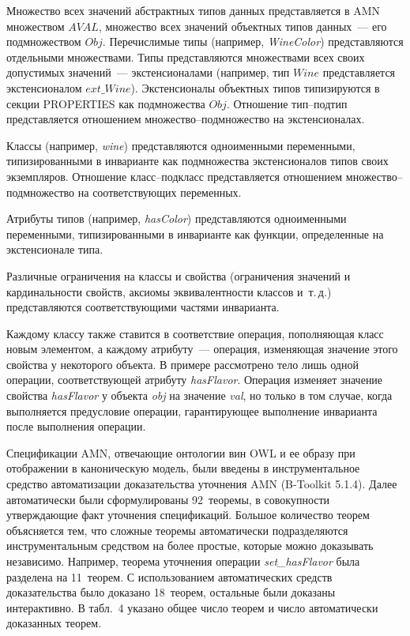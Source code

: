 \begin{multicols}{2}
Множество всех значений абстрактных типов данных представляется в AMN
 множеством $AV\!AL$,
множество всех значений объектных типов данных~--- его подмножеством $Obj$.
Перечислимые %
\mbox{типы} (например, {\it WineColor}) представляются
отдельными множествами.
Типы представляются множествами всех своих допустимых значений~--- %
экстенсионалами
(например, тип $Wine$ пред\-став\-ля\-ет\-ся экстенсионалом $ext\_Wine$).
Экстенсионалы объектных типов типизируются в секции \mbox{PROPERTIES}
как подмножества $Obj$.
Отношение тип--под\-тип представляется отношением мно\-же\-ст\-во--под\-мно\-же\-ст\-во
на экстенсионалах.

Классы (например, {\it wine}) представляются
одноименными переменными, типизированными в инварианте как подмножества
экстенсионалов типов своих экземпляров.
Отношение класс--подкласс представляется отношением
множество--под\-мно\-же\-ст\-во на соответствующих переменных.

Атрибуты типов (например, {\it hasColor}) пред\-став\-ля\-ются
одноименными переменными, типизированными в инварианте как
функции, определенные на экстенсионале типа.

Различные ограничения на классы и свойства (ограничения значений и
кардинальности свойств, аксиомы эквивалентности классов и~т.\,д.)
пред\-став\-ля\-ются соответствующими частями инварианта.


Каждому классу также ставится в соответствие операция, пополняющая
класс новым элементом, а каждому атрибуту~--- операция,
изменяющая значение этого свойства у некоторого объекта.
В примере рассмотрено тело лишь одной операции, соответствующей
атрибуту {\it hasFlavor}. Операция изменяет значение свойства {\it hasFlavor}
у объекта {\it obj} на значение {\it val}, но только в том случае,
когда выполняется предусловие операции, гарантирующее выполнение
инварианта после выполнения операции.


Спецификации AMN, отвечающие онтологии вин OWL и
ее образу при отображении в каноническую модель,
были введены в инструментальное средство автоматизации доказательства
уточнения AMN (B-Toolkit 5.1.4).
Далее автоматически были сформулированы 92~теоремы,
в совокупности утверждающие факт уточнения
спецификаций.
Большое количество теорем объясняется тем, что
сложные теоремы автоматически подразделяются инструментальным средством
на более простые, которые можно доказывать независимо.
Например, теорема уточнения операции {\it set\_hasFlavor} была разделена
на 11~теорем.
С использованием автоматических средств доказательства
было доказано 18~теорем, остальные были доказаны интерактивно.
В табл.~4 указано общее число теорем
и число автоматически доказанных теорем.



\end{multicols}
